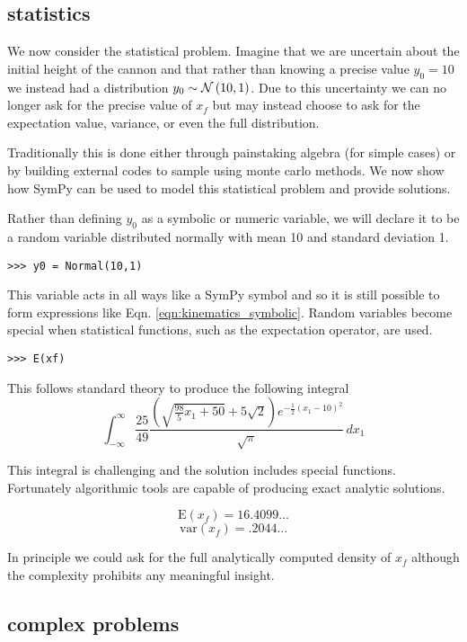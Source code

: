 \subsection{statistics}

We now consider the statistical problem. Imagine that we are uncertain about the initial height of the cannon and that rather than knowing a precise value $y_0 = 10$ we instead had a distribution $y_0 \sim \mathcal{N}\left(10, 1\right)$. Due to this uncertainty we can no longer ask for the precise value of $x_f$ but may instead choose to ask for the expectation value, variance, or even the full distribution. 

Traditionally this is done either through painstaking algebra (for simple cases) or by building external codes to sample using monte carlo methods. We now show how SymPy can be used to model this statistical problem and provide solutions. 

Rather than defining $y_0$ as a symbolic or numeric variable, we will declare it to be a random variable distributed normally with mean 10 and standard deviation 1. 
\begin{lstlisting}
>>> y0 = Normal(10,1)
\end{lstlisting}

This variable acts in all ways like a SymPy symbol and so it is still possible to form expressions like Eqn. \ref{eqn:kinematics_symbolic}. Random variables become special when statistical functions, such as the expectation operator, are used.

\begin{lstlisting}
>>> E(xf)
\end{lstlisting}

This follows standard theory to produce the following integral
$$\int_{-\infty}^{\infty} \frac{25}{49} \frac{\left(\sqrt{\frac{98}{5} x_{1} + 50} + 5 \sqrt{2}\right) e^{- \frac{1}{2} \left(x_{1} -10\right)^{2}}}{\sqrt{\pi}}\, dx_{1}$$

This integral is challenging and the solution includes special functions. Fortunately algorithmic tools are capable of producing exact analytic solutions. 

$$\textrm{E}(x_f) = 16.4099...$$
$$\textrm{var}(x_f) = .2044...$$

In principle we could ask for the full analytically computed density of $x_f$ although the complexity prohibits any meaningful insight. 

\subsection{complex problems}

